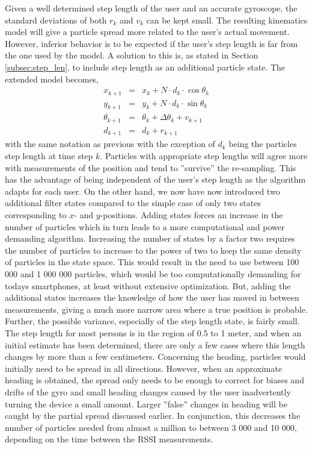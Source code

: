 \documentclass{LTHthesis}
\begin{document}
Given a well determined step length of the user and an accurate gyroscope, the standard deviations of both $r_k$ and $v_k$ can be kept small. The resulting kinematics model will give a particle spread more related to the user's actual movement. However, inferior behavior is to be expected if the user's step length is far from the one used by the model. A solution to this is, as stated in Section \ref{subsec:step_len}, to include step length as an additional particle state. The extended model becomes,
%
\begin{eqnarray}
x_{k+1} &  = & x_k + N\cdot d_k\cdot\cos{\theta_k} \nonumber\\
y_{k+1} & = &y_k + N\cdot d_k\cdot\sin{\theta_k}\label{eq:heading_step_len_kin_mod}\\
\theta_{k+1} & = & \theta_k +\Delta\theta_k+ v_{k+1} \nonumber \\
d_{k+1} & = & d_k + r_{k+1}\nonumber
\end{eqnarray}  
%
with the same notation as previous with the exception of $d_k$ being the particles step length at time step $k$. Particles with appropriate step lengths will agree more with measurements of the position and tend to ''survive'' the re-sampling. This has the advantage of being independent of the user's step length as the algorithm adapts for each user. On the other hand, we now have now introduced two additional filter states compared to the simple case of only two states corresponding to $x$- and $y$-positions. Adding states forces an increase in the number of particles which in turn leads to a more computational and power demanding algorithm. Increasing the number of states by a factor two requires the number of particles to increase to the power of two to keep the same density of particles in the state space. This would result in the need to use between 100 000 and 1 000 000 particles, which would be too computationally demanding for todays smartphones, at least without extensive optimization. But, adding the additional states increases the knowledge of how the user has moved in between measurements, giving a much more narrow area where a true position is probable. Further, the possible variance, especially of the step length state, is fairly small. The step length for most persons is in the region of 0.5 to 1 meter, and when an initial estimate has been determined, there are only a few cases where this length changes by more than a few centimeters. Concerning the heading, particles would initially need to be spread in all directions. However, when an approximate heading is obtained, the spread only needs to be enough to correct for biases and drifts of the gyro and small heading changes caused by the user inadvertently turning the device a small amount. Larger ''false'' changes in heading will be caught by the partial spread discussed earlier. In conjunction, this decreases the number of particles needed from almost a million to between 3 000 and 10 000, depending on the time between the RSSI measurements.       
\end{document}
